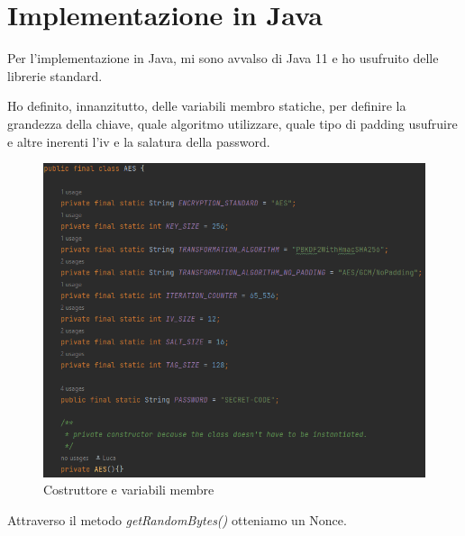 


\section{Implementazione in Java}

\textsf{\small Per l'implementazione in Java, mi sono avvalso di Java 11 e ho usufruito delle librerie standard.} %

\textsf{\small Ho definito, innanzitutto, delle variabili membro statiche, per definire la grandezza della chiave, quale algoritmo utilizzare, quale tipo di padding usufruire e altre inerenti l'iv e la salatura della password.}

\begin{figure}[H]
	\centering
	\includegraphics[width=1\textwidth, height=1\textheight, keepaspectratio]{./images/code/java/constructor_and_member_variables.PNG}
	\caption{Costruttore e variabili membre}
	\label{fig:constructor_and_member_variables}
\end{figure}

\textsf{\small Attraverso il metodo \emph{getRandomBytes()} otteniamo un Nonce.} %


